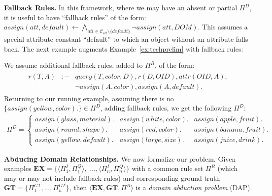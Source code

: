 \smallskip
\noindent\textbf{Fallback Rules.}
In this framework, where we may have an absent or partial $\Pi^D$, it is useful to have ``fallback rules'' of the form: 
$assign(att,default) \leftarrow \bigwedge_{att \in \mathcal{C}_{att}\setminus\{default\}}\neg assign(att,DOM)$.  This assumes a special attribute constant ``default'' to which an object without an attribute falls back.  
The next example augments Example~\ref{ex:techprelim} with fallback rules:

\smallskip

\begin{example}
    We assume additional fallback rules, added to $\Pi^{R}$, of the form:
        \begin{equation*}
        \begin{array}{c}
            \begin{array}{rcl}
                r(T, A) &:-& query(T, color, D), r(D, OID), attr(OID, A),
                \\ && \neg assign(A, color), assign(A, default).
            \end{array}
        \end{array}
    \end{equation*}
    Returning to our running example, assuming there is no $\{assign(yellow,color).\} \in \Pi^{D}$, adding fallback rules, we get the following $\Pi^{D}$:
    \begin{equation*}
        \begin{array}{cc}
             \Pi^{D} = \left\{
            \begin{array}{lll}
                assign(glass, material). &
                assign(white, color). &
                assign(apple, fruit). \\
                assign(round, shape). &
                assign(red, color). &
                assign(banana, fruit). \\
                assign(yellow, default). & assign(large,size). &
                assign(juice, drink).
            \end{array}
            \right.
        \end{array}
    \end{equation*}
\label{ex:prwithfallback}
\end{example}


\noindent\textbf{Abducing Domain Relationships.}  We now formalize our problem.  
Given examples
$\mathbf{EX} = \{\langle \Pi^{I}_1,\Pi^Q_1\rangle,$ $\ldots,\langle\Pi^{I}_n,\Pi^Q_n\rangle \}$ with a common rule set $\Pi^{R}$ (which may or may not include fallback rules) and corresponding ground truth $\mathbf{GT}=\{\Pi^{GT}_1,\ldots,\Pi^{GT}_n \}$, 
then $\langle \mathbf{EX},\mathbf{GT},\Pi^{R} \rangle$ is a \textit{domain abduction problem} (DAP).  

